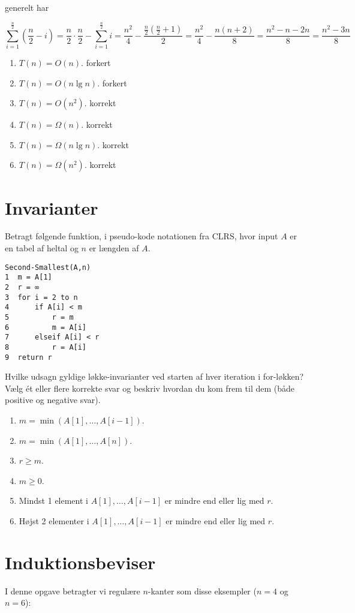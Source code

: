 \documentclass{article}
\theoremstyle{definition}
\begin{document}
generelt har 

\[
\sum_{i=1}^{\frac{n}{2}} (\frac{n}{2} - i) = \frac{n}{2} \cdot \frac{n}{2} - \sum_{i=1}^{\frac{n}{2}} i = \frac{n^2}{4} - \frac{\frac{n}{2}(\frac{n}{2}+1)}{2} = \frac{n^2}{4} - \frac{n(n+2)}{8} = \frac{n^2-n-2n}{8} = \frac{n^2-3n}{8}
\]

\begin{enumerate}
    \item $T(n) = O(n)$. forkert
    \item $T(n) = O(n\lg n)$. forkert
    \item $T(n) = O(n^2)$. korrekt
    \item $T(n) = \Omega(n)$. korrekt 
    \item $T(n) = \Omega(n\lg n)$. korrekt
    \item $T(n) = \Omega(n^2)$. korrekt
\end{enumerate}

\section{Invarianter}
Betragt følgende funktion, i pseudo-kode notationen fra CLRS, hvor input $A$ er en tabel af heltal og $n$ er længden af $A$.

\begin{verbatim}
Second-Smallest(A,n)
1  m = A[1]
2  r = ∞
3  for i = 2 to n
4      if A[i] < m
5          r = m
6          m = A[i]
7      elseif A[i] < r
8          r = A[i]
9  return r
\end{verbatim}

Hvilke udsagn gyldige løkke-invarianter ved starten af hver iteration i for-løkken? Vælg ét eller flere korrekte svar og beskriv hvordan du kom frem til dem (både positive og negative svar).

\begin{enumerate}
    \item $m = \min(A[1],\ldots,A[i-1])$.
    \item $m = \min(A[1],\ldots,A[n])$.
    \item $r \geq m$.
    \item $m \geq 0$.
    \item Mindst 1 element i $A[1],\ldots,A[i-1]$ er mindre end eller lig med $r$.
    \item Højst 2 elementer i $A[1],\ldots,A[i-1]$ er mindre end eller lig med $r$.
\end{enumerate}

\section{Induktionsbeviser}
I denne opgave betragter vi regulære $n$-kanter som disse eksempler ($n = 4$ og $n = 6$):
\end{document}
